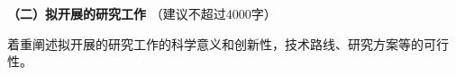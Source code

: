 
{\kaishu{}\sihao{}
  \textcolor{NsfcBlue}
  {\bfseries{}（二）拟开展的研究工作}
  \color{NsfcBlue}（建议不超过4000字）
}

{\kaishu{}\sihao{}
  \color{NsfcBlue}
  着重阐述拟开展的研究工作的科学意义和创新性，技术路线、研究方案等的可行性。
}
